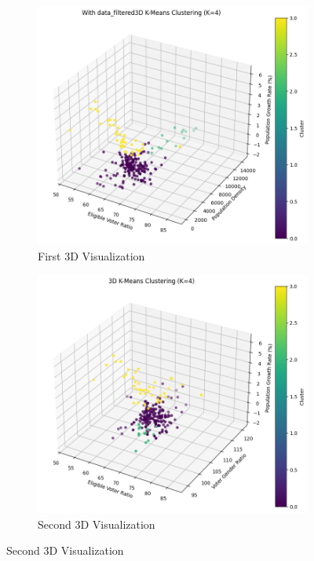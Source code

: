 \begin{figure}[h]
\begin{subfigure}{0.5\textwidth}
    \includegraphics[width=1\linewidth]{images/first_3d_visual.png}
    \caption{First 3D Visualization}
    \label{fig:first_3d_visual}

\end{subfigure}
\begin{subfigure}{0.5\textwidth}
        \includegraphics[width=1\linewidth]{images/second_3d_visual.png}
    \caption{Second 3D Visualization}
    \label{fig:second_3d_visual}


\end{subfigure}
\end{figure}
